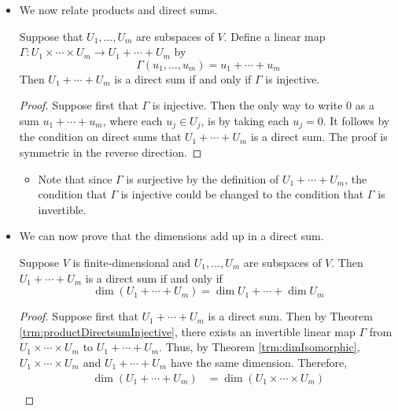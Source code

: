 \documentclass[../main.tex]{subfiles}
\begin{document}
\begin{itemize}
\begin{theorem}
\begin{proof}
        \end{proof}
    \end{theorem}
    \item We now relate products and direct sums.
    \begin{theorem}\label{trm:productDirectsumInjective}
        Suppose that $U_1,\dots,U_m$ are subspaces of $V$. Define a linear map $\Gamma:U_1\times\cdots\times U_m\to U_1+\cdots+U_m$ by
        \begin{equation*}
            \Gamma(u_1,\dots,u_m) = u_1+\cdots+u_m
        \end{equation*}
        Then $U_1+\cdots+U_m$ is a direct sum if and only if $\Gamma$ is injective.
        \begin{proof}
            Suppose first that $\Gamma$ is injective. Then the only way to write 0 as a sum $u_1+\cdots+u_m$, where each $u_j\in U_j$, is by taking each $u_j=0$. It follows by the condition on direct sums that $U_1+\cdots+U_m$ is a direct sum. The proof is symmetric in the reverse direction.
        \end{proof}
    \end{theorem}
    \begin{itemize}
        \item Note that since $\Gamma$ is surjective by the definition of $U_1+\cdots+U_m$, the condition that $\Gamma$ is injective could be changed to the condition that $\Gamma$ is invertible.
    \end{itemize}
    \item We can now prove that the dimensions add up in a direct sum.
    \begin{theorem}\label{trm:dimDirectSum}
        Suppose $V$ is finite-dimensional and $U_1,\dots,U_m$ are subspaces of $V$. Then $U_1+\cdots+U_m$ is a direct sum if and only if
        \begin{equation*}
            \dim(U_1+\cdots+U_m) = \dim U_1+\cdots+\dim U_m
        \end{equation*}
        \begin{proof}
            Suppose first that $U_1+\cdots+U_m$ is a direct sum. Then by Theorem \ref{trm:productDirectsumInjective}, there exists an invertible linear map $\Gamma$ from $U_1\times\cdots\times U_m$ to $U_1+\cdots+U_m$. Thus, by Theorem \ref{trm:dimIsomorphic}, $U_1\times\cdots\times U_m$ and $U_1+\cdots+U_m$ have the same dimension. Therefore,
            \begin{align*}
                \dim(U_1+\cdots+U_m) &= \dim(U_1\times\cdots\times U_m)\\

\end{align*}
\end{proof}
\end{theorem}
\end{itemize}
\end{document}
